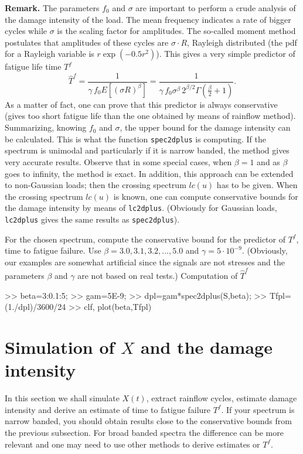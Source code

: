 \textbf{ Remark.} The parameters $f_0$ and $\sigma$  are important
to perform a crude
analysis of the damage intensity of the load.
The mean frequency indicates a rate of
bigger cycles while $\sigma$ is the scaling factor for amplitudes.
The so-called moment method postulates that amplitudes of these cycles are
$\sigma\cdot R$, Rayleigh distributed (the pdf for a  Rayleigh variable is
$r\exp(-0.5r^2)$). This gives a very simple predictor of fatigue life time
$T^f$
$$
\hat T^f=\frac{1}{\gamma\,f_0E[(\sigma R)^\beta]}=
\frac{1}{\gamma\,f_0\sigma^\beta\,2^{\beta/2}\Gamma(\frac{\beta}{2}+1)}.
$$
As a matter of fact, one can prove that this predictor
is always conservative (gives
too short fatigue life than the one obtained by means of
rainflow method). Summarizing,
knowing $f_0$ and $\sigma$, the upper bound for the damage intensity can
be calculated. This is what the function \verb|spec2dplus| is computing.
If the spectrum is unimodal and particularly if it
is narrow banded, the method gives very accurate results.
Observe that in some special cases, when $\beta=1$ and as  $\beta$ goes to
infinity, the method is exact.
In addition,
this approach can be extended to non-Gaussian loads; then the crossing spectrum
$lc(u)$ has to be given. When the crossing spectrum $lc(u)$ is known,
one can compute conservative bounds for the
damage intensity by means of \verb|lc2dplus|. (Obviously for Gaussian loads,
 \verb|lc2dplus| gives the same results as \verb|spec2dplus|).

For the chosen spectrum, compute the conservative bound for the
predictor  of $T^f$, time to fatigue
failure. Use $\beta=3.0, 3.1, 3.2,\ldots, 5.0$ and
$\gamma=5\cdot10^{-9}$.
(Obviously, our examples are somewhat artificial since
the signals are not stresses and the parameters $\beta$ and $\gamma$
are not based on real tests.)
Computation of $\hat T^f$
\begin{code}
>> beta=3:0.1:5;
>> gam=5E-9;
>> dpl=gam*spec2dplus(S,beta);
>> Tfpl=(1./dpl)/3600/24  %
>> clf, plot(beta,Tfpl)
\end{code}


\section{Simulation of $X$ and the damage intensity}


In this section we shall simulate $X(t)$, extract rainflow cycles,
estimate damage intensity and derive an estimate of time to fatigue
failure $T^f$. If your spectrum is narrow banded, you should obtain
results close to the conservative bounds from the previous subsection.
For broad banded spectra the difference can be more relevant and
one may need to use other methods to derive estimates or $T^f$.

